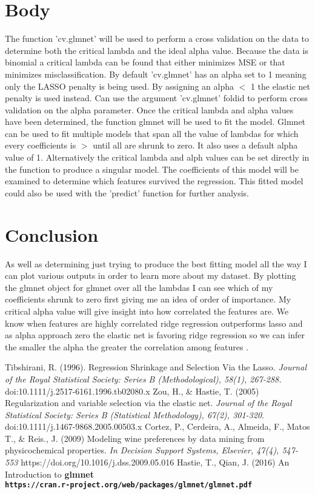 \documentclass[10pt]{article}
\begin{document}
\section{Body}\label{sec:body}
The function 'cv.glmnet' will be used to perform a cross validation on the data to determine both the critical lambda and the ideal alpha value. Because the data is binomial a critical lambda can be found that either minimizes MSE or that minimizes misclassification. By default 'cv.glmnet' has an alpha set to 1 meaning only the LASSO penalty is being used. By assigning an alpha $ < $ 1  the elastic net penalty is used instead. Can use the argument 'cv.glmnet'  foldid  to perform cross validation on the alpha parameter. 
Once the critical lambda and alpha values have been determined, the function glmnet will be used to fit the model. Glmnet can be used to fit multiple models that span all the value of lambdas for which every coefficients is $ > $ until all are shrunk to zero. It also uses a default alpha value of 1.  Alternatively the critical lambda and alph values can be set directly in the function to produce a singular model.  The coefficients of this model will be examined to determine which features survived the regression. This fitted model could also be used with the 'predict' function for further analysis. 

\section{Conclusion}\label{sec:conclusion}
As well as determining just trying to produce the best fitting model all the way I can plot various outputs in order to learn more about my dataset. By plotting the glmnet object for glmnet over all the lambdas I can see which of my coefficients shrunk to zero first giving me an idea of order of importance. My critical alpha value will give insight into how correlated the features are. We know when features are highly correlated ridge regression outperforms lasso and as alpha approach zero the elastic net is favoring ridge regression so we can infer the smaller the alpha the greater the correlation among features \cite{4} .



\begin{thebibliography}{9}
Tibshirani, R. (1996).
Regression Shrinkage and Selection Via the Lasso.
\textit{Journal of the Royal Statistical Society: Series B (Methodological), 58(1), 267-288.}
doi:10.1111/j.2517-6161.1996.tb02080.x
Zou, H., \& Hastie, T. (2005)
Regularization and variable selection via the elastic net.
\textit{Journal of the Royal Statistical Society: Series B (Statistical Methodology), 67(2), 301-320}.
doi:10.1111/j.1467-9868.2005.00503.x
Cortez, P., Cerdeira, A., Almeida, F., Matos T., \& Reis., J. (2009)
Modeling wine preferences by data mining from physicochemical properties.
\textit{In Decision Support Systems, Elsevier, 47(4), 547-553}
https://doi.org/10.1016/j.dss.2009.05.016
Hastie, T., Qian, J. (2016)
An Introduction to \bf{glmnet}
\\\texttt{https://cran.r-project.org/web/packages/glmnet/glmnet.pdf}

\end{thebibliography}
\end{document}
